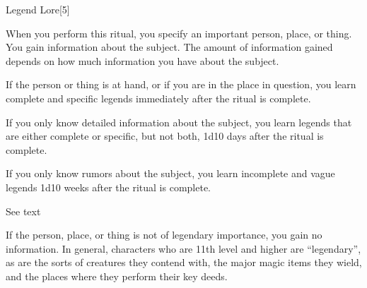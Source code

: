 \begin{spellsection}{Legend Lore}[5]
    \begin{spellheader}
    \end{spellheader}
    \begin{spellcontent}
        \begin{spelltargetinginfo}
        \end{spelltargetinginfo}
        \begin{spelleffects}
            \spelleffect When you perform this ritual, you specify an important person, place, or thing. You gain information about the subject. The amount of information gained depends on how much information you have about the subject.

            If the person or thing is at hand, or if you are in the place in question, you learn complete and specific legends immediately after the ritual is complete.

            If you only know detailed information about the subject, you learn legends that are either complete or specific, but not both, 1d10 days after the ritual is complete.

            If you only know rumors about the subject, you learn incomplete and vague legends 1d10 weeks after the ritual is complete.

            \spelldur See text
        \end{spelleffects}
    \end{spellcontent}
    \begin{spellfooter}
        \spellnotes If the person, place, or thing is not of legendary importance, you gain no information. In general, characters who are 11th level and higher are ``legendary'', as are the sorts of creatures they contend with, the major magic items they wield, and the places where they perform their key deeds.
    \end{spellfooter}
\end{spellsection}

